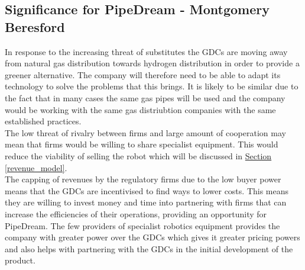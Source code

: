 \documentclass[11pt]{article}		%
\newcommand{\sectref}[1]{\hyperref[#1]{Section \ref*{#1}}}     %
\begin{document}
                
                
            
               \subsection{Significance for PipeDream - Montgomery Beresford}
                In response to the increasing threat of substitutes the GDCs are moving away from natural gas distribution towards hydrogen distribution in order to provide a greener alternative. The company will therefore need to be able to adapt its technology to solve the problems that this brings. It is likely to be similar due to the fact that in many cases the same gas pipes will be used and the company would be working with the same gas distriubtion companies with the same established practices.
                \\
                The low threat of rivalry between firms and large amount of cooperation may mean that firms would be willing to share specialist equipment. This would  reduce the viability of selling the robot which will be discussed in \sectref{revenue_model}. 
                \\
                The capping of revenues by the regulatory firms due to the low buyer power means that the GDCs are incentivised to find ways to lower costs. This means they are willing to invest money and time into partnering with firms that can increase the efficiencies of their operations, providing an opportunity for PipeDream.
                The few providers of specialist robotics equipment provides the company with greater power over the GDCs which gives it greater pricing powers and also helps with partnering with the GDCs in the initial development of the product.
\end{document}
